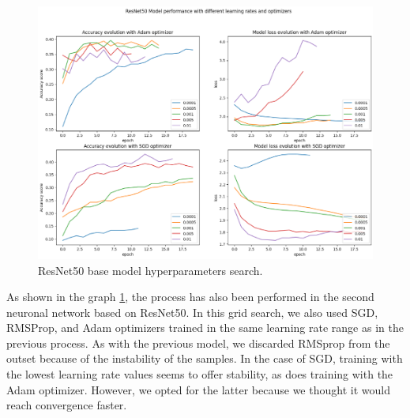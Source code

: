 \begin{figure}[ht]
    \begin{center}
        \includegraphics[scale=0.9]{images/Building/Hyperparameters/RestNet50_Model performance hyperparameters search.png}
        \caption{ResNet50 base model hyperparameters search.}
    \label{fig: ResNet50_hyperparameters}    
    \end{center}
\end{figure}

As shown in the graph \ref{fig: ResNet50_hyperparameters}, the process has also been performed in the second neuronal network based on ResNet50. In this grid search, we also used SGD, RMSProp, and Adam optimizers trained in the same learning rate range as in the previous process. As with the previous model, we discarded RMSprop from the outset because of the instability of the samples. In the case of SGD, training with the lowest learning rate values seems to offer stability, as does training with the Adam optimizer. However, we opted for the latter because we thought it would reach convergence faster. 

\newpage
